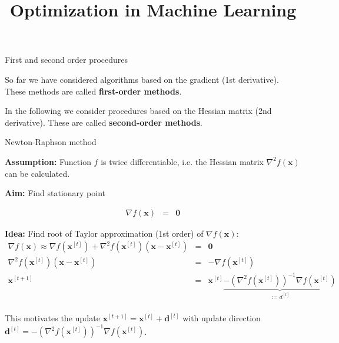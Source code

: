 \documentclass[11pt,compress,t,notes=noshow, xcolor=table]{beamer}
\title{Optimization in Machine Learning}
\date{}
\begin{document}
\sloppy

\begin{vbframe}{First and second order procedures}

So far we have considered algorithms based on the gradient (1st derivative). These methods are called \textbf{first-order methods}.

\lz

In the following we consider procedures based on the Hessian matrix (2nd derivative). These are called \textbf{second-order methods}.

\end{vbframe}

\begin{vbframe}{Newton-Raphson method}

\textbf{Assumption:} Function $f$ is twice differentiable, i.e. the Hessian matrix $\nabla^2 f(\bm{x})$ can be calculated.

\lz

\textbf{Aim:} Find stationary point

\vspace*{-0.2cm}
\begin{eqnarray*}
\nabla f(\bm{x}) &=& \bm{0}
\end{eqnarray*}

\textbf{Idea:} Find root of Taylor approximation (1st order) of $\nabla f(\bm{x})$:
\begin{eqnarray*}
\nabla f(\mathbf{x}) \approx \nabla f(\mathbf{x}^{[t]}) +
\nabla^2 f(\mathbf{x}^{[t]})(\mathbf{x} - \mathbf{x}^{[t]}) &=& \mathbf{0} \\
\nabla^2 f(\mathbf{x}^{[t]})(\mathbf{x} - \mathbf{x}^{[t]}) &=& - \nabla f(\mathbf{x}^{[t]}) \\
\mathbf{x}^{[t+1]} &=& \mathbf{x}^{[t]} \underbrace{- \left(\nabla^2 f(\mathbf{x}^{[t]})\right)^{-1}\nabla f(\mathbf{x}^{[t]})}_{:= d^{[t]}} \\
\end{eqnarray*}

\vspace*{-0.2cm}

This motivates the update $\bm{x}^{[t+1]} = \bm{x}^{[t]} + \bm{d}^{[t]}$ with update direction $\bm{d}^{[t]} = - \left(\nabla^2 f(\mathbf{x}^{[t]})\right)^{-1}\nabla f(\mathbf{x}^{[t]})$.


\end{vbframe}
\end{document}
